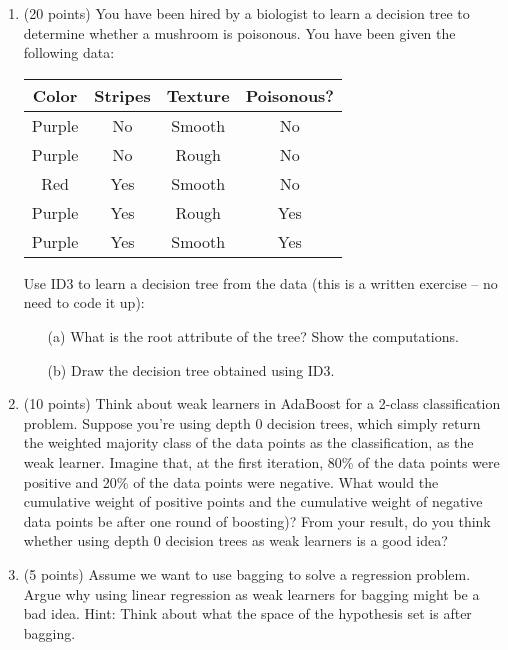 \documentclass[11pt]{article}
\begin{document}
\begin{enumerate}
\item (20 points)
You have been hired by a biologist to learn a decision tree to determine whether a mushroom is poisonous. You have been given the following data:

\vspace{-7pt}
\begin{center}
\begin{tabular}{| c | c | c | c |}
    \hline
    Color & Stripes & Texture & Poisonous? \\
    \hline
    Purple  & No    & Smooth    & No \\
    Purple  & No    & Rough     & No \\
    Red     & Yes   & Smooth    & No \\
    Purple  & Yes   & Rough     & Yes \\
    Purple  & Yes   & Smooth    & Yes \\
    \hline
\end{tabular}
\end{center}
\vspace{-7pt}

Use ID3 to learn a decision tree from the data (this is a written exercise -- no need to code it up):
\begin{itemize}
    \item[(a)] What is the root attribute of the tree? Show the computations.
    \item[(b)] Draw the decision tree obtained using ID3.
\end{itemize}

\item (10 points)
Think about weak learners in AdaBoost for a 2-class classification problem.
Suppose you're using depth 0 decision trees, which
  simply return the weighted majority class of the data points as the
  classification, as the weak learner. 
  Imagine that, at the first iteration, 80\% of the data points were positive 
  and 20\% of the data points were negative.
  What would the cumulative weight of positive points and the cumulative weight of negative data points be after one round of boosting)?
  From your result, do you think whether using
  depth 0 decision trees as weak learners is a good idea?

\item (5 points)
Assume we want to use bagging to solve a regression problem. 
Argue why using linear regression as weak learners for bagging might be a bad idea.
Hint: Think about what the space of the hypothesis set is after bagging.


\end{enumerate}
\end{document}
